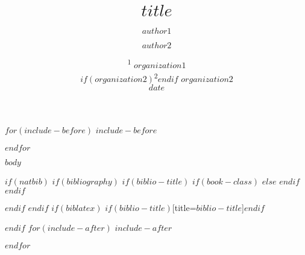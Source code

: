 \documentclass[$if(fontsize)$$fontsize$,$endif$$if(lang)$$babel-lang$,$endif$$if(papersize)$$papersize$paper,$endif$$for(classoption)$$classoption$$sep$,$endfor$]{$documentclass$}
\title{$title$}
\author{$author1$ \and $author2$}
\date{%
		\textsuperscript{1} $organization1$\\%
		$if(organization2)$\textsuperscript{2}$endif$ $organization2$\\[2ex]
		$date$
   }
\begin{document}
$for(include-before)$
$include-before$

$endfor$

$body$

$if(natbib)$
$if(bibliography)$
$if(biblio-title)$
$if(book-class)$
\renewcommand\bibname{$biblio-title$}
$else$
\renewcommand\refname{$biblio-title$}
$endif$
$endif$


$endif$
$endif$
$if(biblatex)$
\printbibliography$if(biblio-title)$[title=$biblio-title$]$endif$

$endif$
$for(include-after)$
$include-after$

$endfor$
\end{document}
